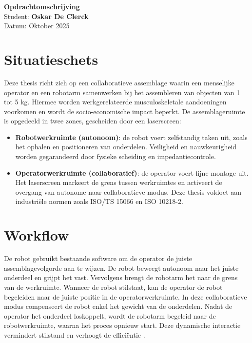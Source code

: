 \documentclass[11pt,a4paper]{article}
\begin{document}
\begin{center}
    \large\textbf{Opdrachtomschrijving}\\
    \normalsize Student: \textbf{Oskar De Clerck} \\
    Datum: Oktober 2025
\end{center}

\section*{Situatieschets}
Deze thesis richt zich op een collaboratieve assemblage waarin een menselijke operator en een robotarm samenwerken bij het assembleren van objecten van 1 tot 5 kg. Hiermee worden werkgerelateerde musculoskeletale aandoeningen voorkomen en wordt de socio-economische impact beperkt. De assemblageruimte is opgedeeld in twee zones, gescheiden door een laserscreen:  

\begin{itemize}
    \item \textbf{Robotwerkruimte (autonoom)}: de robot voert zelfstandig taken uit, zoals het ophalen en positioneren van onderdelen. Veiligheid en nauwkeurigheid worden gegarandeerd door fysieke scheiding en impedantiecontrole.  
    \item \textbf{Operatorwerkruimte (collaboratief)}: de operator voert fijne montage uit. Het laserscreen markeert de grens tussen werkruimtes en activeert de overgang van autonome naar collaboratieve modus. Deze thesis voldoet aan industriële normen zoals ISO/TS 15066 en ISO 10218-2.
\end{itemize}

\section*{Workflow}
De robot gebruikt bestaande software om de operator de juiste assemblagevolgorde aan te wijzen. De robot beweegt autonoom naar het juiste onderdeel en grijpt het vast. Vervolgens brengt de robotarm het naar de grens van de werkruimte. Wanneer de robot stilstaat, kan de operator de robot begeleiden naar de juiste positie in de operatorwerkruimte. In deze collaboratieve modus compenseert de robot enkel het gewicht van de onderdelen. Nadat de operator het onderdeel loskoppelt, wordt de robotarm begeleid naar de robotwerkruimte, waarna het proces opnieuw start. Deze dynamische interactie vermindert stilstand en verhoogt de efficiëntie \cite{Praxie_Cobot}\cite{ScienceDirect_Cobot}.  
\end{document}
